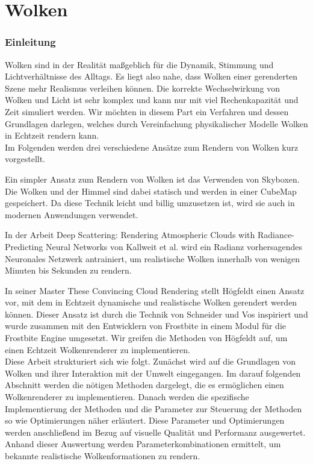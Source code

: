 \part{Wolken}
\section{Einleitung}
\label{sec:introduction}

Wolken sind in der Realität maßgeblich für die Dynamik, Stimmung und Lichtverhältnisse des Alltags. Es liegt also nahe, dass Wolken einer gerenderten Szene mehr Realismus verleihen können. Die korrekte Wechselwirkung von Wolken und Licht ist sehr komplex und kann nur mit viel Rechenkapazität und Zeit simuliert werden. Wir möchten in diesem Part ein Verfahren und dessen Grundlagen darlegen, welches durch Vereinfachung physikalischer Modelle Wolken in Echtzeit rendern kann.\\

Im Folgenden werden drei verschiedene Ansätze zum Rendern von Wolken kurz vorgestellt.

Ein simpler Ansatz zum Rendern von Wolken ist das Verwenden von Skyboxen. Die Wolken und der Himmel sind dabei statisch und werden in einer CubeMap gespeichert. Da diese Technik leicht und billig umzusetzen ist, wird sie auch in modernen Anwendungen verwendet.

In der Arbeit Deep Scattering: Rendering Atmospheric Clouds with Radiance-Predicting Neural Networks von Kallweit et al. \cite{Kallweit17} wird ein Radianz vorhersagendes Neuronales Netzwerk antrainiert, um realistische Wolken innerhalb von wenigen Minuten bis Sekunden zu rendern.

In seiner Master These Convincing Cloud Rendering stellt Högfeldt \cite{Högfeldt16} einen Ansatz vor, mit dem in Echtzeit dynamische und realistische Wolken gerendert werden können. Dieser Ansatz ist durch die Technik von Schneider und Vos \cite{Schneider15} inspiriert und wurde zusammen mit den Entwicklern von Frostbite in einem Modul für die Frostbite Engine umgesetzt. Wir greifen die Methoden von Högfeldt auf, um einen Echtzeit Wolkenrenderer zu implementieren.\\

Diese Arbeit strukturiert sich wie folgt. Zunächst wird auf die Grundlagen von Wolken und ihrer Interaktion mit der Umwelt eingegangen. Im darauf folgenden Abschnitt werden die nötigen Methoden dargelegt, die es ermöglichen einen Wolkenrenderer zu implementieren. Danach werden die spezifische Implementierung der Methoden und die Parameter zur Steuerung der Methoden so wie Optimierungen näher erläutert. Diese Parameter und Optimierungen werden anschließend im Bezug auf visuelle Qualität und Performanz ausgewertet. Anhand dieser Auswertung werden Parameterkombinationen ermittelt, um bekannte realistische Wolkenformationen zu rendern.

